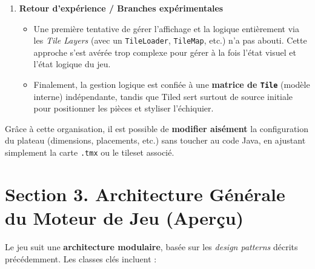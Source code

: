 \documentclass[11pt,a4paper]{article}
\begin{document}
\begin{enumerate}[label=\arabic*.]
    \item \textbf{Retour d’expérience / Branches expérimentales}
    \begin{itemize}
        \item Une première tentative de gérer l’affichage et la logique entièrement via les \emph{Tile Layers} (avec un \texttt{TileLoader}, \texttt{TileMap}, etc.) n’a pas abouti. Cette approche s’est avérée trop complexe pour gérer à la fois l’état visuel et l’état logique du jeu.
        \item Finalement, la gestion logique est confiée à une \textbf{matrice de \texttt{Tile}} (modèle interne) indépendante, tandis que Tiled sert surtout de source initiale pour positionner les pièces et styliser l’échiquier.
    \end{itemize}
\end{enumerate}

Grâce à cette organisation, il est possible de \textbf{modifier aisément} la configuration du plateau (dimensions, placements, etc.) sans toucher au code Java, en ajustant simplement la carte \texttt{.tmx} ou le tileset associé.

\section*{Section 3. Architecture Générale du Moteur de Jeu (Aperçu)}

Le jeu suit une \textbf{architecture modulaire}, basée sur les \emph{design patterns} décrits précédemment. Les classes clés incluent :
\end{document}
